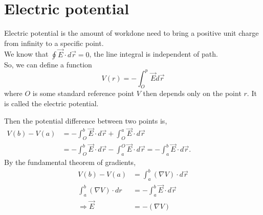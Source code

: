 \section{Electric potential}
\begin{definition}
	Electric potential is the amount of workdone need to bring a positive unit charge from infinity to a specific point.\\
We know that $\oint \vec{E} \cdot d \vec{r}=0$, the line integral is independent of path.
	\\So, we can define a function
	\begin{equation}
	V(r)=-\int_{O}^{p} \vec{E} d \vec{r}
	\end{equation} 
	where $O$ is some standard reference point $V$ then depends only on the point $r .$ It is called the
	electric potential.
\end{definition}
Then the potential difference between two points is,\\
$\begin{aligned} V({b})-V({a}) &=-\int_{{O}}^{{b}} \vec{E} \cdot d \vec{r}+\int_{{O}}^{{a}} \vec{E} \cdot d \vec{r} \\ &=-\int_{{O}}^{{b}} \vec{E} \cdot d \vec{r}-\int_{{a}}^{{O}} \vec{E} \cdot d \vec{r}=-\int_{{a}}^{{b}} \vec{E} \cdot d \vec{r} . \end{aligned}$\\
By the fundamental theorem of gradients,
\begin{align*}
V({b})-V({a})&=\int_{a}^{b}(\nabla V) \cdot d \vec{r} \\
\int_{{a}}^{{b}}(\nabla V) \cdot d {r}&=-\int_{{a}}^{{b}} \vec{E} \cdot d \vec{r}\\
\Longrightarrow \vec{E}&=-(\nabla V)
\end{align*}
\begin{center}
\end{center}
